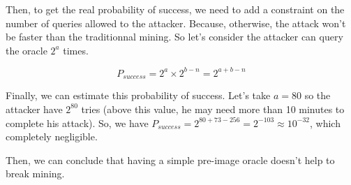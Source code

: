 Then, to get the real probability of success, we need to add a constraint on the number of queries allowed to the attacker. Because, otherwise, the attack won't be faster than the traditionnal mining. So let's consider the attacker can query the oracle $2^a$ times.

\begin{equation}
P_{success} = 2^a \times 2^{b-n} = 2^{a + b - n}
\end{equation}
\newline

Finally, we can estimate this probability of success. Let's take $a = 80$ so the attacker have $2^{80}$ tries (above this value, he may need more than 10 minutes to complete his attack). So, we have $P_{success} = 2^{80+73-256} = 2^{-103} \approx 10^{-32}$, which completely negligible.

Then, we can conclude that having a simple pre-image oracle doesn't help to break mining.
